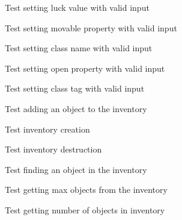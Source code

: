 \begin{DoxyRefList}
Test setting luck value with valid input  
\item[Global \doxylink{class__test_8c_a68fec3617d7294e2290f373ce780ace3}{test1\+\_\+class\+\_\+set\+\_\+movable} ()]\label{test__test000052}%
%
Test setting movable property with valid input  
\item[Global \doxylink{class__test_8c_a8b50781d9c77a5a425b7844b76bc3604}{test1\+\_\+class\+\_\+set\+\_\+name} ()]\label{test__test000038}%
%
Test setting class name with valid input  
\item[Global \doxylink{class__test_8c_a04821e406c11676c9c12259fd270ab4b}{test1\+\_\+class\+\_\+set\+\_\+open} ()]\label{test__test000060}%
%
Test setting open property with valid input  
\item[Global \doxylink{class__test_8c_a32e36fdbb032c21bf710e9970d37e404}{test1\+\_\+class\+\_\+set\+\_\+tag} ()]\label{test__test000034}%
%
Test setting class tag with valid input  
\item[Global \doxylink{inventory__test_8c_abddf20d7b11937754a88fb57c9d74292}{test1\+\_\+inventory\+\_\+add\+\_\+object} ()]\label{test__test000070}%
%
Test adding an object to the inventory  
\item[Global \doxylink{inventory__test_8c_a33638f1a88ae16ab8d6bee00145b82b8}{test1\+\_\+inventory\+\_\+create} ()]\label{test__test000066}%
%
Test inventory creation  
\item[Global \doxylink{inventory__test_8c_ab161eafe6a61db39b2237e97c677d822}{test1\+\_\+inventory\+\_\+destroy} ()]\label{test__test000068}%
%
Test inventory destruction  
\item[Global \doxylink{inventory__test_8c_ae06d675912e7cd3a86516a908f5029d1}{test1\+\_\+inventory\+\_\+find\+\_\+object} ()]\label{test__test000084}%
%
Test finding an object in the inventory  
\item[Global \doxylink{inventory__test_8c_a17c5d7d6ecb4161696deca0155e13f4f}{test1\+\_\+inventory\+\_\+get\+\_\+max\+\_\+objects} ()]\label{test__test000078}%
%
Test getting max objects from the inventory  
\item[Global \doxylink{inventory__test_8c_afc2a33c1716a6e0522f61e0d399102c5}{test1\+\_\+inventory\+\_\+get\+\_\+num\+\_\+objects} ()]\label{test__test000082}%
%
Test getting number of objects in inventory  

\end{DoxyRefList}
